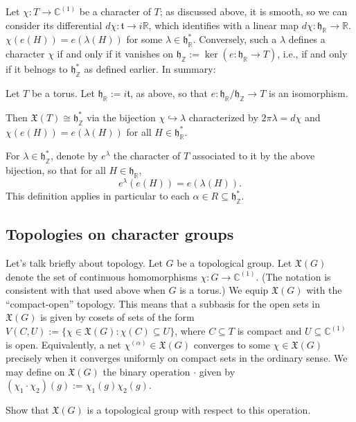 \documentclass[reqno]{amsart} 
\begin{document}
Let $\chi : T \rightarrow \mathbb{C}^{(1)}$ be a character of $T$; as discussed above, it is smooth, so we can consider its differential $d \chi : \mathfrak{t} \rightarrow i \mathbb{R}$, which identifies with a linear map $d \chi : \mathfrak{h}_\mathbb{R} \rightarrow \mathbb{R}$.  $\chi(e(H)) = e(\lambda(H))$ for some $\lambda \in \mathfrak{h}_\mathbb{R}^*$.  Conversely, such a $\lambda$ defines a character $\chi$ if and only if it vanishes on $\mathfrak{h}_\mathbb{Z} := \ker(e : \mathfrak{h}_\mathbb{R} \rightarrow T)$, i.e., if and only if it belnogs to $\mathfrak{h}_\mathbb{Z}^*$ as defined earlier.  In summary:
\begin{lemma}
  Let $T$ be a torus.  Let $\mathfrak{h}_\mathbb{R} := i \mathfrak{t}$, as above, so that $e : \mathfrak{h}_\mathbb{R} / \mathfrak{h}_\mathbb{Z} \rightarrow T$ is an isomorphism.

  Then $\mathfrak{X}(T) \cong \mathfrak{h}_\mathbb{Z}^*$ via the bijection $\chi \hookrightarrow \lambda$ characterized by $2 \pi \lambda = d \chi$ and $\chi(e(H)) = e(\lambda(H))$ for all $H \in \mathfrak{h}_\mathbb{R}^*$.
\end{lemma}
\begin{definition}\label{defn:char-associated-to-functional}
  For $\lambda \in \mathfrak{h}_\mathbb{Z}^*$, denote by $e^\lambda$ the character of $T$ associated to it by the above bijection, so that for all $H \in \mathfrak{h}_\mathbb{R}$,
  \begin{equation*}
    e^\lambda(e(H)) = e(\lambda(H)).
  \end{equation*}
  This definition applies in particular to each $\alpha \in R \subseteq \mathfrak{h}_\mathbb{Z}^*$.
\end{definition}

\subsection{Topologies on character groups\label{sec:tops-on-char-gps}}
\label{sec:org00a6b97}
Let's talk briefly about topology.  Let $G$ be a topological group.  Let $\mathfrak{X}(G)$ denote the set of continuous homomorphisms $\chi : G \rightarrow \mathbb{C}^{(1)}$.  (The notation is consistent with that used above when $G$ is a torus.)  We equip $\mathfrak{X}(G)$ with the ``compact-open'' topology.  This means that a subbasis for the open sets in $\mathfrak{X}(G)$ is given by cosets of sets of the form $V(C,U) := \{\chi \in \mathfrak{X}(G) : \chi(C) \subseteq U\}$, where $C \subseteq T$ is compact and $U \subseteq \mathbb{C}^{(1)}$ is open.  Equivalently, a net $\chi^{(\alpha)} \in \mathfrak{X}(G)$ converges to some $\chi \in \mathfrak{X}(G)$ precisely when it converges uniformly on compact sets in the ordinary sense.  We may define on $\mathfrak{X}(G)$ the binary operation $\cdot$ given by $(\chi_1 \cdot \chi_2)(g) := \chi_1(g) \chi_2(g)$.
\begin{exercise}
  Show that $\mathfrak{X}(G)$ is a topological group with respect to this operation.
\end{exercise}
\end{document}

